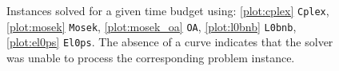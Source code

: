 \documentclass[11pt]{article}
\begin{document}
\begin{figure}[!ht]
    \vspace*{-0.25cm}
    \centering
    
    \vspace*{-0.5cm}
    \caption{Instances solved for a given time budget using: \ref{plot:cplex} \texttt{Cplex}, \ref{plot:mosek} \texttt{Mosek}, \ref{plot:mosek_oa} \texttt{OA}, \ref{plot:l0bnb} \texttt{L0bnb}, \ref{plot:el0ps} \texttt{El0ps}. The absence of a curve indicates that the solver was unable to process the corresponding problem instance.}
    \label{fig:perfprofiles}
    \vspace*{-0.25cm}
\end{figure}


{
    \small
    
}
\end{document}
